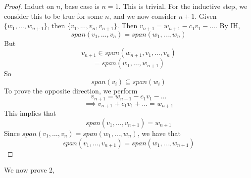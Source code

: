 \documentclass{article}
\newtheorem{one minute paper}[theorem]{One Minute Paper}
\begin{document}
\begin{proof}
    Induct on $n$, base case is $n=1$. This is trivial. For the inductive step, we consider this to be true for some $n$, and we now consider $n+1$. Given 
    $\{w_1,\dots,w_{n+1}\}$, then $\{v_1,\dots,v_n,v_{n+1}\}$. Then $v_{n+1} = w_{n+1} - c_1v_1 - \dots$. By IH, 
    \begin{equation}
        span(v_1,\dots,v_n) = span(w_1,\dots,w_n)
    \end{equation}
    But 
    \begin{equation}
        v_{n+1} \in span(w_{n+1}, v_1,\dots,v_n)
    \end{equation}
    \begin{equation}
        = span(w_1,\dots,w_{n+1})
    \end{equation}
    So 
    \begin{equation}
        span({v_i}) \subseteq span({w_i})
    \end{equation}
    To prove the opposite direction, we perform 
    \begin{equation}
        v_{n+1} = w_{n+1} - c_1v_1 - \dots
    \end{equation}
    \begin{equation}
        \implies v_{n+1} + c_1v_1 + \dots = w_{n+1}
    \end{equation}
    This implies that 
    \begin{equation}
        span(v_1,\dots,v_{n+1}) = w_{n+1}
    \end{equation}
    Since $span(v_1,\dots,v_n) = span(w_1,\dots,w_n)$, we have that 
    \begin{equation}
        span(v_1,\dots,v_{n+1}) = span(w_1,\dots,w_{n+1})
    \end{equation}
\end{proof}

We now prove 2, 
\end{document}
